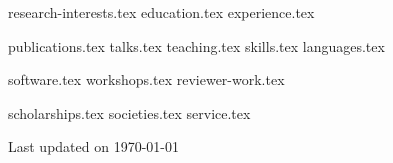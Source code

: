 \documentclass[letterpaper,13pt]{article}
\newcommand{\updateinfo}[1][\today]{\par\vfill\hfill{\normalsize\color{MidnightBlue}Last
    updated on #1}}
\begin{document}


{research-interests.tex}
{education.tex}
{experience.tex}

\pagebreak

{publications.tex}
{talks.tex}
{teaching.tex}
\sidebyside
    {{skills.tex}}
    {{languages.tex}}

\pagebreak

{software.tex}
{workshops.tex}
{reviewer-work.tex}

\pagebreak

{scholarships.tex}
{societies.tex}
{service.tex}

\updateinfo
\end{document}
